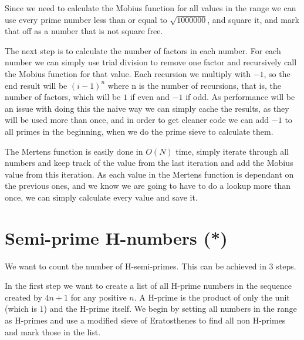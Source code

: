 \documentclass[11pt,a4paper,twoside]{article}
\begin{document}
Since we need to calculate the Mobius function for all values in the range we
can use every prime number less than or equal to $\sqrt{1000000}$, and square
it, and mark that off as a number that is not square free.

The next step is to calculate the number of factors in each number. For each
number we can simply use trial division to remove one factor and recursively
call the Mobius function for that value. Each recursion we multiply with $-1$,
so the end result will be $(i-1)^n$ where n is the number of recursions, that
is, the number of factors, which will be $1$ if even and $-1$ if odd. As
performance will be an issue with doing this the naive way we can simply cache
the results, as they will be used more than once, and in order to get cleaner
code we can add $-1$ to all primes in the beginning, when we do the prime sieve
to calculate them.

%
%
%
%
%
%
%
%
%
%
%
%
%
%
%
%
%
%
%
%
%
%
%
%


The Mertens function is easily done in $O(N)$ time, simply iterate through all
numbers and keep track of the value from the last iteration and add the Mobius
value from this iteration. As each value in the Mertens function is dependant
on the previous ones, and we know we are going to have to do a lookup more than
once, we can simply calculate every value and save it.

\section{Semi-prime H-numbers (*)}
We want to count the number of H-semi-primes. This can be achieved in $3$ steps.

In the first step we want to create a list of all H-prime numbers in the
sequence created by $4n + 1$ for any positive $n$. A H-prime is the product of
only the unit (which is $1$) and the H-prime itself. We begin by setting all
numbers in the range as H-primes and use a modified sieve of Eratosthenes to
find all non H-primes and mark those in the list.
\end{document}

